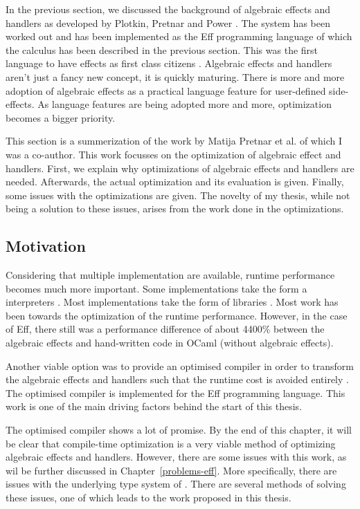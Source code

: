 In the previous section, we discussed the background of algebraic effects and handlers as developed by Plotkin, Pretnar and Power \cite{DBLP:journals/acs/PlotkinP03, DBLP:conf/lics/PlotkinP08}. The system has been worked out and has been implemented as the Eff programming language of which the calculus has been described in the previous section. This was the first language to have effects as first class citizens \cite{pretnar2015introduction}. Algebraic effects and handlers aren't just a fancy new concept, it is quickly maturing. There is more and more adoption of algebraic effects as a practical language feature for user-defined side-effects. As language features are being adopted more and more, optimization becomes a bigger priority.

This section is a summerization of the work by Matija Pretnar et al. of which I was a co-author. This work focusses on the optimization of algebraic effect and handlers. First, we explain why optimizations of algebraic effects and handlers are needed. Afterwards, the actual optimization and its evaluation is given. Finally, some issues with the optimizations are given. The novelty of my thesis, while not being a solution to these issues, arises from the work done in the optimizations.

\subsection{Motivation}

Considering that multiple implementation are available, runtime performance becomes much more important. Some implementations take the form a interpreters \cite{programming, links2ocaml}. Most implementations take the form of libraries \cite{DBLP:conf/icfp/Brady13, kammar, eff2ocaml}. Most work has been towards the optimization of the runtime performance. However, in the case of Eff, there still was a performance difference of about 4400\% between the algebraic effects and hand-written code in OCaml (without algebraic effects).

Another viable option was to provide an optimised compiler in order to transform the algebraic effects and handlers such that the runtime cost is avoided entirely \cite{optimization}. The optimised compiler is implemented for the Eff programming language. This work is one of the main driving factors behind the start of this thesis. 

The optimised compiler shows a lot of promise. By the end of this chapter, it will be clear that compile-time optimization is a very viable method of optimizing algebraic effects and handlers. However, there are some issues with this work, as wil be further discussed in Chapter~\ref{problems-eff}. More specifically, there are issues with the underlying type system of \eff. There are several methods of solving these issues, one of which leads to the work proposed in this thesis.

